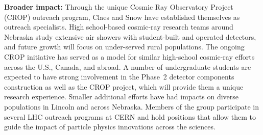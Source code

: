 \documentclass[11pt]{article}
\begin{document}
{\bf Broader impact:}
Through the unique Cosmic Ray
Observatory Project (CROP) outreach program, Claes and Snow have established themselves as outreach specialists.  High school-based cosmic-ray research teams around Nebraska study
extensive air showers with student-built and operated detectors, and future growth will focus on under-served rural
populations. The ongoing CROP initiative has served as a model for similar high-school cosmic-ray efforts across the U.S., Canada, and abroad. A number of undergraduate students are expected to have strong involvement in the Phase~2 detector components construction as well as the CROP project, which will provide them a unique research experience. Smaller additional efforts
have had impacts on diverse populations in Lincoln and across
Nebraska. Members of the group participate in several LHC outreach programs at CERN and hold positions that allow them to guide the impact of particle physics innovations across the sciences.
\end{document}
